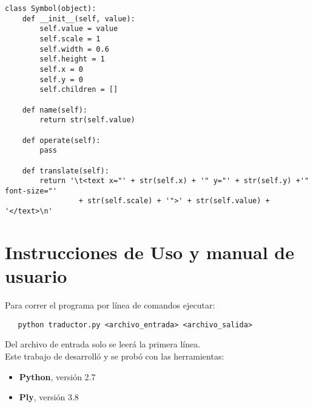\begin{verbatim}
class Symbol(object):
    def __init__(self, value):
        self.value = value
        self.scale = 1
        self.width = 0.6
        self.height = 1
        self.x = 0
        self.y = 0
        self.children = []

    def name(self):
        return str(self.value)

    def operate(self):
        pass

    def translate(self):
        return '\t<text x="' + str(self.x) + '" y="' + str(self.y) +'" font-size="' 
                 + str(self.scale) + '">' + str(self.value) + '</text>\n'
\end{verbatim}


\newpage

\section{Instrucciones de Uso y manual de usuario}

\indent \indent Para correr el programa por línea de comandos ejecutar:\\
\begin{verbatim}
   python traductor.py <archivo_entrada> <archivo_salida>
\end{verbatim}

\indent Del archivo de entrada solo se leerá la primera línea.\\
\indent Este trabajo de desarrolló y se probó con las herramientas:
\begin{itemize}
\item \textbf{Python}, versión 2.7
\item \textbf{Ply}, versión 3.8
\end{itemize}



